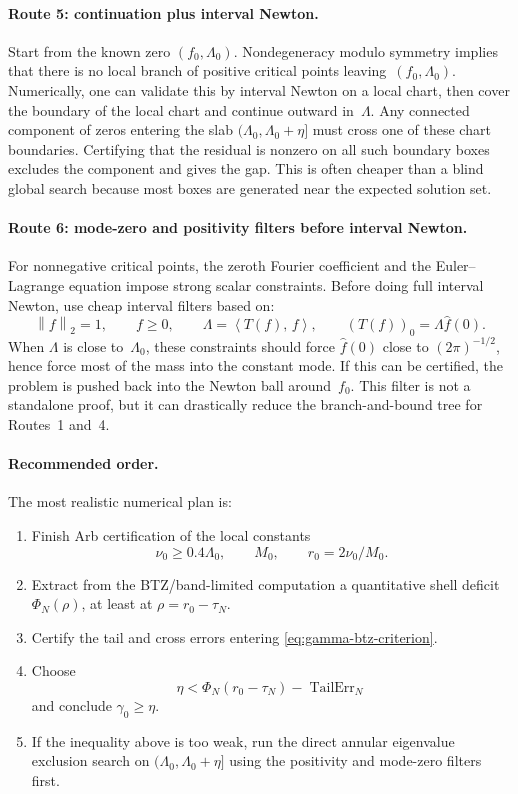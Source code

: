 \documentclass[12pt]{article}
\theoremstyle{definition}
\theoremstyle{remark}
\newcommand{\norm}[1]{\left\|#1\right\|}
\newcommand{\ip}[2]{\left\langle #1,\, #2\right\rangle}
\begin{document}
\paragraph{Route 5: continuation plus interval Newton.}
Start from the known zero \((f_0,\Lambda_0)\).  Nondegeneracy modulo
symmetry implies that there is no local branch of positive critical
points leaving~\((f_0,\Lambda_0)\).  Numerically, one can validate this by
interval Newton on a local chart, then cover the boundary of the local
chart and continue outward in~\(\Lambda\).  Any connected component of
zeros entering the slab \((\Lambda_0,\Lambda_0+\eta]\) must cross one of
these chart boundaries.  Certifying that the residual is nonzero on all
such boundary boxes excludes the component and gives the gap.  This is
often cheaper than a blind global search because most boxes are generated
near the expected solution set.

\paragraph{Route 6: mode-zero and positivity filters before interval
Newton.}
For nonnegative critical points, the zeroth Fourier coefficient and the
Euler--Lagrange equation impose strong scalar constraints.  Before doing
full interval Newton, use cheap interval filters based on:
\[
  \norm{f}_2=1,\qquad f\geq0,\qquad
  \Lambda=\ip{T(f)}{f},\qquad
  (T(f))_0=\Lambda \widehat f(0).
\]
When \(\Lambda\) is close to~\(\Lambda_0\), these constraints should force
\(\widehat f(0)\) close to \((2\pi)^{-1/2}\), hence force most of the
mass into the constant mode.  If this can be certified, the problem is
pushed back into the Newton ball around~\(f_0\).  This filter is not a
standalone proof, but it can drastically reduce the branch-and-bound
tree for Routes~1 and~4.

\paragraph{Recommended order.}
The most realistic numerical plan is:
\begin{enumerate}[leftmargin=2em]
  \item Finish Arb certification of the local constants
  \[
    \nu_0\geq0.4\Lambda_0,\qquad
    M_0,\qquad
    r_0=2\nu_0/M_0.
  \]
  \item Extract from the BTZ/band-limited computation a quantitative
  shell deficit \(\Phi_N(\rho)\), at least at
  \(\rho=r_0-\tau_N\).
  \item Certify the tail and cross errors entering
  \eqref{eq:gamma-btz-criterion}.
  \item Choose
  \[
    \eta
    <
    \Phi_N(r_0-\tau_N)-\operatorname{TailErr}_N
  \]
  and conclude \(\gamma_0\geq\eta\).
  \item If the inequality above is too weak, run the direct annular
  eigenvalue exclusion search on
  \((\Lambda_0,\Lambda_0+\eta]\) using the positivity and mode-zero
  filters first.
\end{enumerate}
\end{document}
